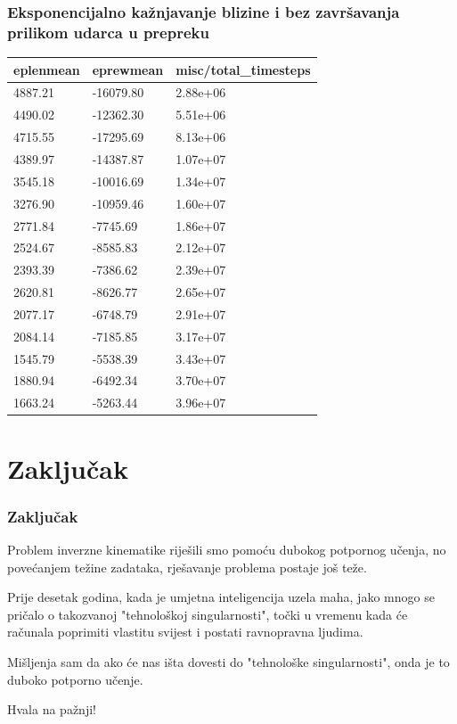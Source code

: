 \documentclass{beamer}
\begin{document}
\begin{frame}
	\frametitle{Eksponencijalno kažnjavanje blizine i bez završavanja prilikom udarca u prepreku}

	\begin{table}[ht!]
		\centering
		\label{tab:rub}
		\begin{tabular}{@{}lll@{}}
			\hline
			eplenmean & eprewmean & misc/total\_timesteps \\
			\hline
			\hline
			4887.21   & -16079.80 & 2.88e+06              \\
			4490.02   & -12362.30 & 5.51e+06              \\
			4715.55   & -17295.69 & 8.13e+06              \\
			4389.97   & -14387.87 & 1.07e+07              \\
			3545.18   & -10016.69 & 1.34e+07              \\
			3276.90   & -10959.46 & 1.60e+07              \\
			2771.84   & -7745.69  & 1.86e+07              \\
			2524.67   & -8585.83  & 2.12e+07              \\
			2393.39   & -7386.62  & 2.39e+07              \\
			2620.81   & -8626.77  & 2.65e+07              \\
			2077.17   & -6748.79  & 2.91e+07              \\
			2084.14   & -7185.85  & 3.17e+07              \\
			1545.79   & -5538.39  & 3.43e+07              \\
			1880.94   & -6492.34  & 3.70e+07              \\
			1663.24   & -5263.44  & 3.96e+07              \\
			\hline
		\end{tabular}
	\end{table}

\end{frame}

\section{Zaključak}
\begin{frame}
	\frametitle{Zaključak}

	Problem inverzne kinematike riješili smo pomoću dubokog potpornog učenja, no povećanjem težine zadataka, rješavanje problema postaje još teže.
	\bigskip
	
	Prije desetak godina, kada je umjetna inteligencija uzela maha, jako mnogo se pričalo o takozvanoj "tehnološkoj singularnosti", točki u vremenu kada će računala poprimiti vlastitu svijest i postati ravnopravna ljudima.
	\bigskip

	Mišljenja sam da ako će nas išta dovesti do "tehnološke singularnosti", onda je to duboko potporno učenje.

\end{frame}



\begin{frame}
	\begin{center}
		\Huge Hvala na pažnji!
	\end{center}
\end{frame}
\end{document}
